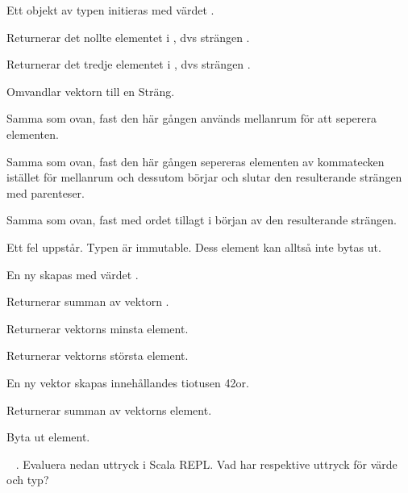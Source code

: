 \SOLUTION


\TaskSolved \what
 

\SubtaskSolved  Ett objekt av typen  initieras med värdet .

\SubtaskSolved  Returnerar det nollte elementet i , dvs strängen .

\SubtaskSolved  Returnerar det tredje elementet i , dvs strängen \code{!}.

\SubtaskSolved  Omvandlar vektorn till en Sträng.

\SubtaskSolved  Samma som ovan, fast den här gången används mellanrum för att seperera elementen.

\SubtaskSolved  Samma som ovan, fast den här gången sepereras elementen av kommatecken istället för mellanrum och dessutom börjar och slutar den resulterande strängen med parenteser.

\SubtaskSolved  Samma som ovan, fast med ordet  tillagt i början av den resulterande strängen.

\SubtaskSolved  Ett fel uppstår. Typen  är immutable. Dess element kan alltså inte bytas ut.

\SubtaskSolved  En ny  skapas med värdet . 

\SubtaskSolved  Returnerar summan av vektorn .

\SubtaskSolved  Returnerar vektorns minsta element.

\SubtaskSolved  Returnerar vektorns största element. 

\SubtaskSolved  En ny vektor skapas innehållandes tiotusen 42or.

\SubtaskSolved  Returnerar summan av vektorns element.

\SubtaskSolved  Byta ut element.



\QUESTEND









\QUESTBEGIN

\Task  \what~ . Evaluera nedan uttryck i Scala REPL. Vad har respektive uttryck för värde och typ?

\Subtask {}

